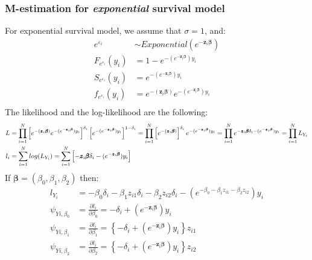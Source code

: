 \documentclass[]{article}
\let\epsilon\varepsilon
\begin{document}
\subsubsection{M-estimation for \emph{exponential} survival model}
\label{MEst:exponential}

For exponential survival model, we assume that $\sigma = 1$, and:
  $$
  \begin{aligned}
    e^{\epsilon_{i}} &\sim Exponential(e^{-\pmb{z}_i \pmb{\beta}})\\
    F_{e^{\epsilon_{i}}}(y_i) &= 1 - e^{-(e^{-\pmb{z}_i \pmb{\beta}})y_i}\\
    S_{e^{\epsilon_{i}}}(y_i) &= e^{-(e^{-\pmb{z}_i \pmb{\beta}})y_i}\\
    f_{e^{\epsilon_{i}}}(y_i) &= e^{-\left(\pmb{z}_i \pmb{\beta}\right)}e^{-(e^{-\pmb{z}_i \pmb{\beta}})y_i}\\
  \end{aligned}
  $$
The likelihood and the log-likelihood are the following:
  $$
  \begin{aligned}
    L &= \prod_{i=1}^N  \left[ e^{-\left(\pmb{z}_i \pmb{\beta}\right)}e^{-(e^{-\pmb{z}_i \pmb{\beta}})y_i} \right]^{\delta_i} \left[e^{-(e^{-\pmb{z}_i \pmb{\beta}})y_i}\right]^{1-\delta_i} =\prod_{i=1}^N   \left[e^{-\left(\pmb{z}_i \pmb{\beta}\right)}\right]^{\delta_i}   e^{-(e^{-\pmb{z}_i \pmb{\beta}})y_i} = \prod_{i=1}^N   e^{-\pmb{z}_i \pmb{\beta}\delta_i-(e^{-\pmb{z}_i \pmb{\beta}})y_i}=\prod_{i=1}^N L_{Y_i}\\
    l_i &=\sum_{i=1}^N log(L_{Y_i}) =\sum_{i=1}^N  \left[  -\pmb{z}_i \pmb{\beta}\delta_i-(e^{-\pmb{z}_i \pmb{\beta}})y_i \right]
  \end{aligned}\\
  $$
If $\pmb{\beta} = (\beta_0, \beta_1, \beta_2)$ then:
  $$
  \begin{aligned}
    l_{Y_i} &=   -\beta_0\delta_i-\beta_1 z_{i1}\delta_i-\beta_2z_{i2}\delta_i-(e^{-\beta_0-\beta_1 z_{i1}-\beta_2z_{i2} })y_i \\
    \psi_{Yi,\beta_0} &= \frac{\partial l_i}{\partial \beta_0} =  -\delta_i+\left(e^{-\pmb{z}_i \pmb{\beta}}\right)y_i\\
    \psi_{Yi,\beta_1} &= \frac{\partial l_i}{\partial \beta_1} =  \left\{-\delta_i+\left(e^{-\pmb{z}_i \pmb{\beta}}\right)y_i\right\}z_{i1} \\
    \psi_{Yi,\beta_2} &= \frac{\partial l_i}{\partial \beta_2} =  \left\{-\delta_i+\left(e^{-\pmb{z}_i \pmb{\beta}}\right)y_i\right\}z_{i2} \\
  \end{aligned}
  $$
  
\end{document}
